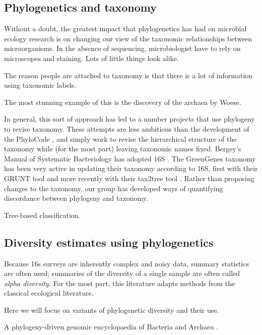 \documentclass{amsart}
\begin{document}
\subsection{Phylogenetics and taxonomy}

Without a doubt, the greatest impact that phylogenetics has had on microbial ecology research is on changing our view of the taxonomic relationships between microorganisms.
In the absence of sequencing, microbiologist have to rely on microscopes and staining.
Lots of little things look alike.

The reason people are attached to taxonomy is that there is a lot of information using taxonomic labels.

The most stunning example of this is the discovery of the archaea by Woese.

In general, this sort of approach has led to a number projects that use phylogeny to revise taxonomy.
These attempts are less ambitious than the development of the PhyloCode \cite{forey2001phylocode}, and simply work to revise the hierarchical structure of the taxonomy while (for the most part) leaving taxonomic names fixed.
Bergey's Manual of Systematic Bacteriology has adopted 16S \cite{kreig1984bergey}.
The GreenGenes taxonomy \cite{desantis2006greengenes} has been very active in updating their taxonomy according to 16S, first with their GRUNT tool \cite{dalevi2007automated} and more recently with their tax2tree tool \cite{mcdonald2011improved}.
Rather than proposing changes to the taxonomy, our group \cite{matsen2011reconciling} has developed ways of quantifying discordance between phylogeny and taxonomy.

Tree-based classification.
\cite{bazinet2012comparative}



\subsection{Diversity estimates using phylogenetics}

Because 16s surveys are inherently complex and noisy data, summary statistics are often used; summaries of the diversity of a single sample are often called \emph{alpha diversity}.
For the most part, this literature adapts methods from the classical ecological literature.

Here we will focus on variants of phylogenetic diversity and their use.

A phylogeny-driven genomic encyclopaedia of Bacteria and Archaea \cite{wu2009phylogeny}.
\end{document}

